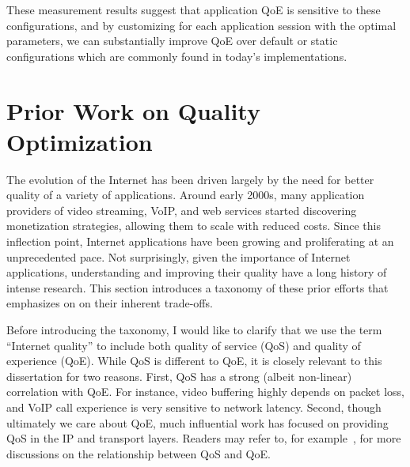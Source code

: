 These measurement results suggest that application QoE is 
sensitive to these configurations, and by customizing for 
each application session with the optimal parameters, 
we can substantially improve QoE over default or static 
configurations which are commonly found in today's 
implementations.


\section{Prior Work on Quality Optimization}
\label{sec:related:quality}

The evolution of the Internet has been driven largely by the need for better 
quality of a variety of applications.
Around early 2000s, many application providers of video streaming, 
VoIP, and web services started discovering monetization strategies, allowing 
them to scale with reduced costs. 
Since this inflection point, Internet applications have been 
growing and proliferating at an unprecedented pace.
Not surprisingly, given the importance of Internet applications, understanding 
and improving their quality have a long history of intense research.
This section introduces a taxonomy of these prior efforts that emphasizes on 
on their inherent trade-offs.

Before introducing the taxonomy, I would like to clarify that we use
the term ``Internet quality'' to include both quality of service (QoS) and 
quality of experience (QoE).
While QoS is different to QoE, it is closely relevant to this dissertation 
for two reasons.
First, QoS has a strong (albeit non-linear) correlation with QoE.
For instance, video buffering highly depends on packet loss, and 
VoIP call experience is very sensitive to network latency.
Second, though ultimately we care about QoE, 
much influential work has focused on providing 
QoS in the IP and transport layers.
Readers may refer to, for example~\cite{chen2015qos}, for more 
discussions on the relationship between QoS and QoE.

